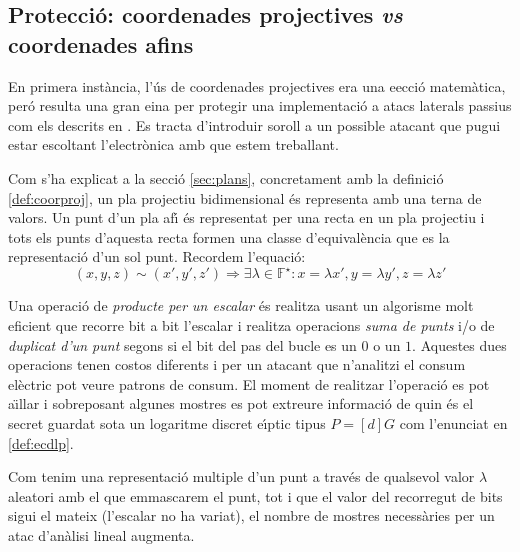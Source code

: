 \documentclass[12pt,twoside,catalan,a4paper]{book}%
\numberwithin{figure}{section}		%
\theoremstyle{definition}   			%
\def\ecdlp{logaritme discret e\lgem{}\'{\i}ptic}%
\newcommand{\F}{\ensuremath{\mathbb{F}}}%
\theoremstyle{saltolinea}   			%
\begin{document}

\subsection{Protecci\'o: coordenades projectives \emph{vs} coordenades afins}\label{subsec:protecProject}

En primera inst\`ancia, l'\'us de coordenades projectives era una e\lgem{}ecci\'o matem\`atica, per\'o resulta una gran eina per protegir una implementaci\'o a atacs laterals passius com els descrits en \cite{KJJ}. Es tracta d'introduir soroll a un possible atacant que pugui estar escoltant l'electr\`onica amb que estem treballant.

Com s'ha explicat a la secci\'o \ref{sec:plans}, concretament amb la definici\'o \ref{def:coorproj}, un pla projectiu bidimensional \'es representa amb una terna de valors. Un punt d'un pla af\'{\i} \'es representat per una recta en un pla projectiu i tots els punts d'aquesta recta formen una classe d'equival\`encia que es la representaci\'o d'un sol punt. Recordem l'equaci\'o:
\begin{equation}\label{eq:project;ch:atacsLaterals}
\left( x,y,z\right) \sim \left( x\prime ,y\prime ,z\prime \right) \Rightarrow \exists \lambda \in \F^\star : x=\lambda x \prime, y=\lambda y \prime, z=\lambda z \prime
\end{equation}

Una operaci\'o de \emph{producte per un escalar} \'es realitza usant un algorisme molt eficient que recorre bit a bit l'escalar i realitza operacions \emph{suma de punts} i/o de \emph{duplicat d'un punt} segons si el bit del pas del bucle es un $0$ o un $1$. Aquestes dues operacions tenen costos diferents i per un atacant que n'analitzi el consum el\`ectric pot veure patrons de consum. El moment de realitzar l'operaci\'o es pot a\"{\i}llar i sobreposant algunes mostres es pot extreure informaci\'o de quin \'es el secret guardat sota un \ecdlp{} tipus $P=\left[d\right]G$ com l'enunciat en \ref{def:ecdlp}.

Com tenim una representaci\'o multiple d'un punt a trav\'es de qualsevol valor $\lambda$ aleatori amb el que emmascarem el punt, tot i que el valor del recorregut de bits sigui el mateix (l'escalar no ha variat), el nombre de mostres necess\`aries per un atac d'an\`alisi lineal augmenta.
\end{document}
